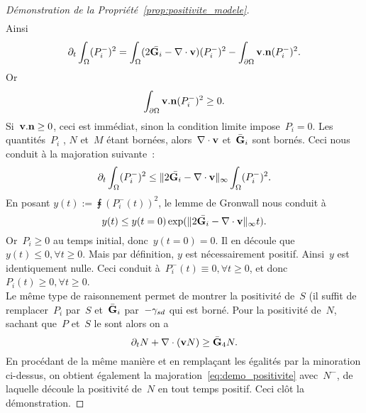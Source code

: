 \documentclass[main.tex]{subfiles}
\begin{document}
\begin{proof}[Démonstration de la Propriété~\ref{prop:positivite_modele}]
$$\begin{aligned}
\end{aligned}$$
Ainsi
\begin{equation}
\partial_t \int_\Omega (P_i^-)^2  = \int_\Omega (2\bar{{\bf G}_i} - \nabla\cdot \mathbf{v})  (P_i^-)^2 - \int_{\partial \Omega} \mathbf{v} . {\bf n} (P_i^-)^2.
\end{equation}
Or $$\int_{\partial \Omega} \mathbf{v} . {\bf n} (P_i^-)^2 \geq 0. $$
Si~$\mathbf{v}.{\bf n}\geq0$, ceci est immédiat, sinon la condition limite impose~$P_i=0$. 
Les quantités~$P_i$ , $N$ et~$M$ étant bornées, alors~$\nabla\cdot \mathbf{v}$ et~$\bar{{\bf G}}_i$ sont bornés. Ceci nous conduit à la majoration suivante~:
\begin{equation}\label{eq:demo_positivite}
\partial_t \int_\Omega (P_i^-)^2 \leq \| 2\bar{{\bf G}_i} - \nabla\cdot \mathbf{v} \|_{\infty} \int_\Omega (P_i^-)^2.
\end{equation}
En posant $y(t):=\displaystyle \intx (P_i^-(t))^2$, le lemme de Gronwall nous conduit à
\begin{equation}
y(t) \leq y(t=0) \exp ( \| 2\bar{{\bf G}_i} - \nabla\cdot \mathbf{v} \|_{\infty} t  ).
\end{equation}
Or~$P_i\geq 0$ au temps initial, donc~$y(t=0)=0$. Il en découle que~$y(t)\leq0, \forall t\geq0$. Mais par définition, $y$ est nécessairement positif. Ainsi~$y$ est identiquement nulle. Ceci conduit à~$P_i^-(t)\equiv0, \forall t\geq0$, et donc $P_i(t)\geq0, \forall t\geq0$. \\
Le même type de raisonnement permet de montrer la positivité de~$S$ (il suffit de remplacer~$P_i$ par~$S$ et~$\bar{{\bf G}}_i$ par~$-\gamma_{sd}$ qui est borné. Pour la positivité de~$N$, sachant que~$P$ et~$S$ le sont alors on a
$$ \partial_t N + \nabla\cdot (\mathbf{v} N) \geq \bar{{\bf G}}_4 N.$$
En procédant de la même manière et en remplaçant les égalités par la minoration ci-dessus, on obtient également la majoration~\eqref{eq:demo_positivite} avec~$N^-$, de laquelle découle la positivité de~$N$ en tout temps positif. Ceci clôt la démonstration.
\end{proof}
\end{document}
